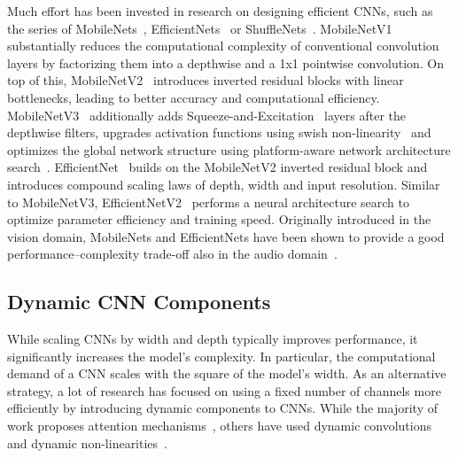 \documentclass[lettersize,journal]{IEEEtran}
\begin{document}
Much effort has been invested in research on designing efficient CNNs, such as the series of MobileNets~\cite{Howard17MobileNets, Sandler18MobileNetsV2, Howard19MobileNetV3}, EfficientNets~\cite{Tan19EfficientNet, Tan21EfficientNetV2} or ShuffleNets~\cite{zhang2018shufflenet, ma2018shufflenetv2}. MobileNetV1~\cite{Howard17MobileNets} substantially reduces the computational complexity of conventional convolution layers by factorizing them into a depthwise and a 1x1 pointwise convolution. On top of this, MobileNetV2~\cite{Sandler18MobileNetsV2} introduces inverted residual blocks with linear bottlenecks, leading to better accuracy and computational efficiency. MobileNetV3~\cite{Howard19MobileNetV3} additionally adds Squeeze-and-Excitation~\cite{Hu18Squeeze} layers after the depthwise filters, upgrades activation functions using swish non-linearity~\cite{ramachandran2017searching} and optimizes the global network structure using platform-aware network architecture search~\cite{tan2019mnasnet}. EfficientNet~\cite{Tan19EfficientNet} builds on the MobileNetV2 inverted residual block and introduces compound scaling laws of depth, width and input resolution. Similar to MobileNetV3, EfficientNetV2~\cite{Tan21EfficientNetV2} performs a neural architecture search to optimize parameter efficiency and training speed. Originally introduced in the vision domain, MobileNets and EfficientNets have been shown to provide a good performance--complexity trade-off also in the audio domain~\cite{Kong20PANNs, Gong21PSLA, Gong22CMKD, Schmid22Efficient}. 

\subsection{Dynamic CNN Components}

While scaling CNNs by width and depth typically improves performance, it significantly increases the model's complexity. In particular, the computational demand of a CNN scales with the square of the model's width. As an alternative strategy, a lot of research has focused on using a fixed number of channels more efficiently by introducing dynamic components to CNNs. While the majority of work proposes attention mechanisms~\cite{Hu18Squeeze, hou2021coordinate, lee2019srm, misra2021triplet, cao2019gcnet, park2018bam, woo2018cbam}, others have used dynamic convolutions~\cite{chen2020dynamic_conv, wu2019dynamic_conv_pay, verelst2020dynamic_conv_spatial, yang2019condconv, zhang2020dynet} and dynamic non-linearities~\cite{si2018dynamic, chen2020dynamic_relu}. 
\end{document}
